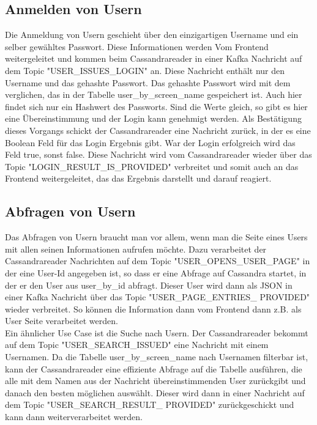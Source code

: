 \subsection{Anmelden von Usern}
Die Anmeldung von Usern geschieht über den einzigartigen Username und ein selber gewähltes Passwort. Diese Informationen werden Vom Frontend weitergeleitet und kommen beim Cassandrareader in einer Kafka Nachricht auf dem Topic "USER\_ISSUES\_LOGIN" an. Diese Nachricht enthält nur den Username und das gehashte Passwort. Das gehashte Passwort wird mit dem verglichen, das in der Tabelle user\_by\_screen\_name gespeichert ist. Auch hier findet sich nur ein Hashwert des Passworts. Sind die Werte gleich, so gibt es hier eine Übereinstimmung und der Login kann genehmigt werden. Als Bestätigung dieses Vorgangs schickt der Cassandrareader eine Nachricht zurück, in der es eine Boolean Feld für das Login Ergebnis gibt. War der Login erfolgreich wird das Feld true, sonst false. Diese Nachricht wird vom Cassandrareader wieder über das Topic "LOGIN\_RESULT\_IS\_PROVIDED" verbreitet und somit auch an das Frontend weitergeleitet, das das Ergebnis darstellt und darauf reagiert.

\subsection{Abfragen von Usern}
\label{subsec:Userabfrage}
Das Abfragen von Usern braucht man vor allem, wenn man die Seite eines Users mit allen seinen Informationen aufrufen möchte. Dazu verarbeitet der Cassandrareader Nachrichten auf dem Topic "USER\_OPENS\_USER\_PAGE" in der eine User-Id angegeben ist, so dass er eine Abfrage auf Cassandra startet, in der er den User aus user\_by\_id abfragt. Dieser User wird dann als JSON in einer Kafka Nachricht über das Topic "USER\_PAGE\_ENTRIES\_ PROVIDED" wieder verbreitet. So können die Information dann vom Frontend dann z.B. als User Seite verarbeitet werden.\\
Ein ähnlicher Use Case ist die Suche nach Usern. Der Cassandrareader bekommt auf dem Topic "USER\_SEARCH\_ISSUED" eine Nachricht mit einem Usernamen. Da die Tabelle user\_by\_screen\_name nach Usernamen filterbar ist, kann der Cassandrareader eine effiziente Abfrage auf die Tabelle ausführen, die alle mit dem Namen aus der Nachricht übereinstimmenden User zurückgibt und danach den besten möglichen auswählt. Dieser wird dann in einer Nachricht auf dem Topic "USER\_SEARCH\_RESULT\_ PROVIDED" zurückgeschickt und kann dann weiterverarbeitet werden.

